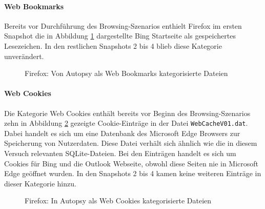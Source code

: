 \begin{appendices}
\paragraph*{Web Bookmarks}
Bereits vor Durchführung des Browsing-Szenarios enthielt Firefox im ersten Snapshot die in Abbildung \ref{img:firefox-web-bookmarks} dargestellte Bing Startseite als gespeichertes Lesezeichen. In den restlichen Snapshots 2 bis 4 blieb diese Kategorie unverändert.
\begin{figure}[h!]
	\centerline{}
	\caption{Firefox: Von Autopsy als \glqq{}Web Bookmarks\grqq{} kategorisierte Dateien}
	\label{img:firefox-web-bookmarks}  
\end{figure}

\paragraph*{Web Cookies}
Die Kategorie \glqq{}Web Cookies\grqq{} enthält bereits vor Beginn des Browsing-Szenarios zehn in Abbildung \ref{img:firefox-web-cookies} gezeigte Cookie-Einträge in der Datei \texttt{WebCacheV01.dat}. Dabei handelt es sich um eine Datenbank des Microsoft Edge Browsers zur Speicherung von Nutzerdaten. Diese Datei verhält sich ähnlich wie die in diesem Versuch relevanten SQLite-Dateien. Bei den Einträgen handelt es sich um Cookies für Bing und die Outlook Webseite, obwohl diese Seiten nie in Microsoft Edge geöffnet wurden. In den Snapshots 2 bis 4 kamen keine weiteren Einträge in dieser Kategorie hinzu.
\begin{figure}[h!]
	\centerline{}
	\caption{Firefox: In Autopsy als \glqq{}Web Cookies\grqq{} kategorisierte Dateien}
	\label{img:firefox-web-cookies}  
\end{figure}


\end{appendices}

